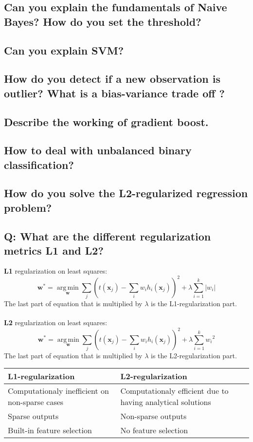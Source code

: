 \subsection{Can you explain the fundamentals of Naive Bayes? How do you set the threshold?}
\subsection{Can you explain SVM?}
\subsection{How do you detect if a new observation is outlier? What is a bias-variance trade off ?}
\subsection{Describe the working of gradient boost.}
\subsection{How to deal with unbalanced binary classification?}
\subsection{How do you solve the L2-regularized regression problem?}
\subsection{Q: What are the different regularization metrics L1 and L2?}
\textbf{L1} regularization on least squares: 
\[\textbf{w}^* = \operatorname*{arg\,min}_{\textbf{w}} \sum_{j} {(t(\textbf{x}_j) - \sum_{i} w_i h_i(\textbf{x}_j))}^2 + \lambda \sum_{i=1}^{k} |w_i|\]
The last part of equation that is multiplied by $\lambda$ is the L1-regularization part.
\\\\
\textbf{L2} regularization on least squares:
\[\textbf{w}^* = \operatorname*{arg\,min}_{\textbf{w}} \sum_{j} {(t(\textbf{x}_j) - \sum_{i} w_i h_i(\textbf{x}_j))}^2 + \lambda \sum_{i=1}^{k} {w_i}^2\]
The last part of equation that is multiplied by $\lambda$ is the L2-regularization part.

\begin{center}
\begin{tabular}{ | p{4cm} | p{4cm}| } 
\hline
\textbf{L1-regularization} & \textbf{L2-regularization} \\ 
\hline
Computationaly inefficient on non-sparse cases & Computationaly efficient due to having analytical solutions \\ 
\hline
Sparse outputs & Non-sparse outputs \\ 
\hline
Built-in feature selection & No feature selection \\
\hline
\end{tabular}
\end{center}

